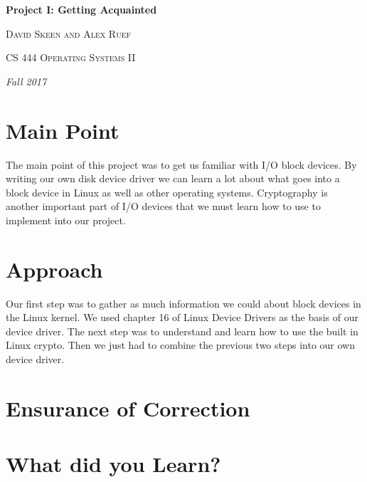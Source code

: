\documentclass[10pt,drafclsnofoot,onecolumn]{article}
\begin{document}
               
\begin{titlepage}
\centering
{\huge\bfseries Project I: Getting Acquainted\par}
\vspace{.5cm}
{\scshape David Skeen and Alex Ruef \par}
\vspace{.5cm}   
{\scshape CS 444 Operating Systems II\par}
\vspace{.5cm} 
{\Large\itshape Fall 2017\par}
\par
\par
\begin{abstract}

\end{abstract}
\end{titlepage}

\section{Main Point}
The main point of this project was to get us familiar with I/O block devices.
By writing our own disk device driver we can learn a lot about what goes into a block device in Linux as well as other operating systems.
Cryptography is another important part of I/O devices that we must learn how to use to implement into our project.

\section{Approach}
Our first step was to gather as much information we could about block devices in the Linux kernel.
We used chapter 16 of Linux Device Drivers as the basis of our device driver.
The next step was to understand and learn how to use the built in Linux crypto.
Then we just had to combine the previous two steps into our own device driver.

\section{Ensurance of Correction}


\section{What did you Learn?}
\end{document}
